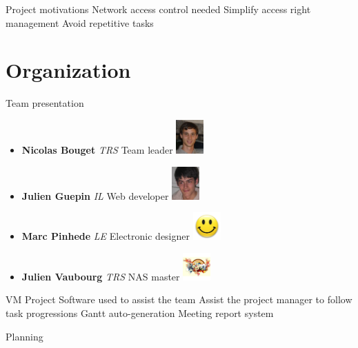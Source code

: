 \documentclass[12pt]{beamer}
\begin{document}
\begin{frame}{Project motivations}
    Network access control needed
    \vfill
    Simplify access right management
    \vfill
    Avoid repetitive tasks

\end{frame}
    

\section{Organization}

\begin{frame}{Team presentation}
    \begin{itemize}
	\item {\bf Nicolas Bouget} \emph{TRS} Team leader \hfill \includegraphics[width=30pt]{img/bouget.jpg}\\
	\vfill
	\item {\bf Julien Guepin} \emph{IL} Web developer \hfill \includegraphics[width=30pt]{img/guepin.jpg}
	\vfill
	\item {\bf Marc Pinhede} \emph{LE} Electronic designer \hfill \includegraphics[width=30pt]{img/pinhede.jpg}
	\vfill
	\item {\bf Julien Vaubourg} \emph{TRS} NAS master \hfill \includegraphics[width=30pt]{img/vaubourg.jpg}
    \end{itemize}
\end{frame}


\begin{frame}{VM Project}
    Software used to assist the team
    \vfill
    Assist the project manager to follow task progressions
    \vfill
    Gantt auto-generation
    \vfill
    Meeting report system
\end{frame}

\begin{frame}{Planning}
\end{frame}
    
\end{document}
